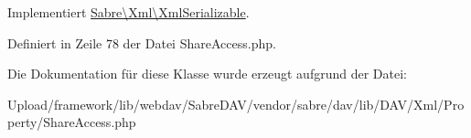Implementiert \mbox{\hyperlink{interface_sabre_1_1_xml_1_1_xml_serializable_aa78f3ee43aa699be8347181653a53d8c}{Sabre\textbackslash{}\+Xml\textbackslash{}\+Xml\+Serializable}}.



Definiert in Zeile 78 der Datei Share\+Access.\+php.



Die Dokumentation für diese Klasse wurde erzeugt aufgrund der Datei\+:\begin{DoxyCompactItemize}
\item 
Upload/framework/lib/webdav/\+Sabre\+D\+A\+V/vendor/sabre/dav/lib/\+D\+A\+V/\+Xml/\+Property/Share\+Access.\+php\end{DoxyCompactItemize}
